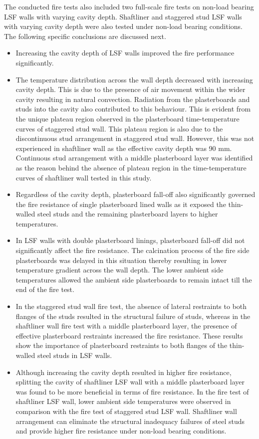 The conducted fire tests also included two full-scale fire tests on non-load bearing LSF walls with varying cavity depth. Shaftliner and staggered stud LSF walls with varying cavity depth were also tested under non-load bearing conditions. The following specific conclusions are discussed next.
\begin{itemize}
	\item Increasing the cavity depth of LSF walls improved the fire performance significantly. 
	\item The temperature distribution across the wall depth decreased with increasing cavity depth. This is due to the presence of air movement within the wider cavity resulting in natural convection. Radiation from the plasterboards and studs into the cavity also contributed to this behaviour. This is evident from the unique plateau region observed in the plasterboard time-temperature curves of staggered stud wall. This plateau region is also due to the discontinuous stud arrangement in staggered stud wall. However, this was not experienced in shaftliner wall as the effective cavity depth was 90 mm. Continuous stud arrangement with a middle plasterboard layer was identified as the reason behind the absence of plateau region in the time-temperature curves of shaftliner wall tested in this study.
	\item Regardless of the cavity depth, plasterboard fall-off also significantly governed the fire resistance of single plasterboard lined walls as it exposed the thin-walled steel studs and the remaining plasterboard layers to higher temperatures. 
	\item In LSF walls with double plasterboard linings, plasterboard fall-off did not significantly affect the fire resistance. The calcination process of the fire side plasterboards was delayed in this situation thereby resulting in lower temperature gradient across the wall depth. The lower ambient side temperatures allowed the ambient side plasterboards to remain intact till the end of the fire test. 
	\item In the staggered stud wall fire test, the absence of lateral restraints to both flanges of the studs resulted in the structural failure of studs, whereas in the shaftliner wall fire test with a middle plasterboard layer, the presence of effective plasterboard restraints increased the fire resistance. These results show the importance of plasterboard restraints to both flanges of the thin-walled steel studs in LSF walls.
	\item Although increasing the cavity depth resulted in higher fire resistance, splitting the cavity of shaftliner LSF wall with a middle plasterboard layer was found to be more beneficial in terms of fire resistance. In the fire test of shaftliner LSF wall, lower ambient side temperatures were observed in comparison with the fire test of staggered stud LSF wall. Shaftliner wall arrangement can eliminate the structural inadequacy failures of steel studs and provide higher fire resistance under non-load bearing conditions. 

\end{itemize}
